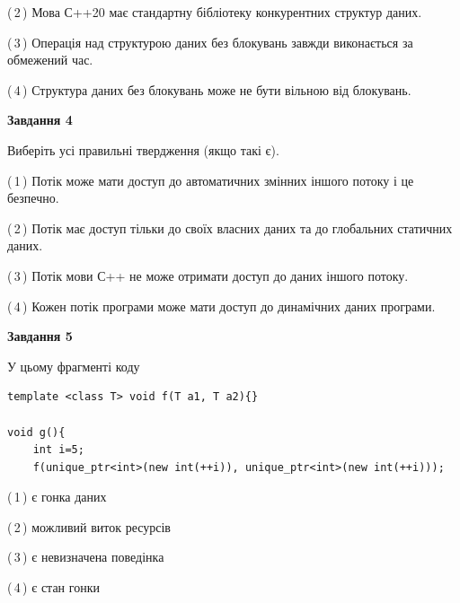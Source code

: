 \documentclass[12pt, ukrainian]{article}
\begin{document}
\begin {large}
{(\,2\,) Мова С++20 має стандартну бібліотеку конкурентних структур даних.%

(\,3\,) Операція над структурою даних без блокувань завжди виконається за обмежений час.%

(\,4\,) Структура даних без блокувань може не бути вільною від блокувань.%



\begin{center}
\textbf{Завдання 4}
\end{center}
Виберіть усі правильні твердження (якщо такі є).\par
\vspace{2mm}

(\,1\,) Потік може мати доступ до автоматичних змінних іншого потоку і це безпечно.%

(\,2\,) Потік має доступ тільки до своїх власних даних та до глобальних статичних даних.%

(\,3\,) Потік мови С++ не може отримати доступ до даних іншого потоку.%

(\,4\,) Кожен потік програми може мати доступ до динамічних даних програми.%



\begin{center}
\textbf{Завдання 5}
\end{center}
У цьому фрагменті коду
\begin{verbatim}
template <class T> void f(T a1, T a2){}

void g(){
    int i=5;
    f(unique_ptr<int>(new int(++i)), unique_ptr<int>(new int(++i)));
\end{verbatim}

(\,1\,) є гонка даних%

(\,2\,) можливий виток ресурсів%

(\,3\,) є невизначена поведінка%

(\,4\,) є стан гонки%


}
\end {large}
\end{document}
